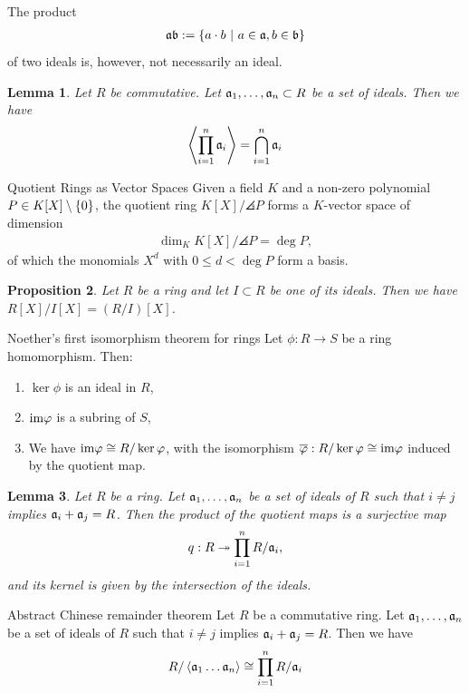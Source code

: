 \documentclass[10pt]{report}
\newtheorem{lemma}{Lemma}[section]
\newtheorem{proposition}[lemma]{Proposition}
\theoremstyle{definition}
\begin{document}
	The product 
	\begin{align*}
		\mathfrak{a}\mathfrak{b} := \qty{a \cdot b ~\middle|~a \in \mathfrak{a}, b \in \mathfrak{b}}
	\end{align*}
	of two ideals is, however, not necessarily an ideal.
	\begin{lemma}
		Let $R$ be commutative. Let $\mathfrak{a}_1, \hdots, \mathfrak{a}_n \subset R$ be a set of ideals. Then we have
		\begin{align*}
			\left\langle \prod_{i = 1}^n \mathfrak{a}_i \right\rangle = \bigcap_{i = 1}^n \mathfrak{a}_i
		\end{align*}
	\end{lemma}
	\begin{importanttheorem}{Quotient Rings as Vector Spaces}{}
		Given a field $K$ and a non-zero polynomial $P \in K[X] \setminus \qty{0}$, the quotient ring $K[X]/\angles{P}$ forms a $K$-vector space of dimension
		\begin{align*}
			\dim_K K[X]/\angles{P} = \deg P,
		\end{align*}
		of which the monomials $X^d$ with $0 \leq d < \deg P$ form a basis.
	\end{importanttheorem}
	\begin{proposition}
		Let $R$ be a ring and let $I \subset R$ be one of its ideals. Then we have $R[X]/I[X] = (R/I)[X]$.
	\end{proposition}
	\begin{importanttheorem}{Noether's first isomorphism theorem for rings}{}
		Let $\phi : R \to S$ be a ring homomorphism. Then:
		\begin{enumerate}
			\item $\ker \phi$ is an ideal in $R$,
			\item $\textnormal{im} \varphi$ is a subring of $S$,
			\item We have $\textnormal{im} \varphi \cong R / \ker \varphi$, with the isomorphism $\overline{{\varphi}} : R / \ker \varphi  \cong \textnormal{im} \varphi$ induced by the quotient map.
		\end{enumerate}
	\end{importanttheorem}
	\begin{lemma}
		Let $R$ be a ring. Let $\mathfrak{a}_1, \hdots, \mathfrak{a}_n$ be a set of ideals of $R$ such that $i \neq j$ implies $\mathfrak{a}_i + \mathfrak{a}_j = R$.
		\newpar
		Then the product of the quotient maps is a surjective map
		\begin{align*}
			q : R \twoheadrightarrow \prod_{i = 1}^n R / \mathfrak{a}_i,
		\end{align*}
		and its kernel is given by the intersection of the ideals.
	\end{lemma}
	\begin{importantcorollary}{Abstract Chinese remainder theorem}{}
		Let $R$ be a commutative ring. Let $\mathfrak{a}_1, \hdots, \mathfrak{a}_n$ be a set of ideals of $R$ such that $i \neq j$ implies $\mathfrak{a}_i + \mathfrak{a}_j = R$. Then we have
		\begin{align*}
			R/\left\langle \mathfrak{a}_1 \hdots \mathfrak{a}_n \right\rangle \cong \prod_{i = 1}^n R/\mathfrak{a}_i
		\end{align*}
	\end{importantcorollary}
\end{document}
